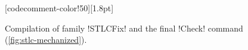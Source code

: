 \begin{figure}
\begin{minipage}{\textwidth}
\begin{multicols}{2}
[codecomment-color!50][1.8pt]

\end{multicols}
\end{minipage}

\vspace{-12pt}

\caption{Compilation of family \lsti!STLCFix! and the final \lsti!Check! command (\cref{fig:stlc-mechanized}).}
\label{fig:stlcfix-compiled}
\end{figure}
